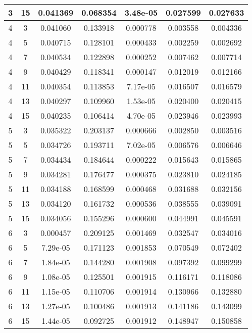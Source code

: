 \begin{longtable}{|c|c|c|c|c|c|c|}
	\hline 3 &	15 &	0.041369 &	0.068354 &	3.48e-05 &	0.027599 &	0.027633 \\
	\hline 4 &	3 &	0.041060 &	0.133918 &	0.000778 &	0.003558 &	0.004336 \\
	\hline \rowcolor{closest} 4 &	5 &	0.040715 &	0.128101 &	0.000433 &	0.002259 &	0.002692 \\
	\hline 4 &	7 &	0.040534 &	0.122898 &	0.000252 &	0.007462 &	0.007714 \\
	\hline 4 &	9 &	0.040429 &	0.118341 &	0.000147 &	0.012019 &	0.012166 \\
	\hline 4 &	11 &	0.040354 &	0.113853 &	7.17e-05 &	0.016507 &	0.016579 \\
	\hline 4 &	13 &	0.040297 &	0.109960 &	1.53e-05 &	0.020400 &	0.020415 \\
	\hline 4 &	15 &	0.040235 &	0.106414 &	4.70e-05 &	0.023946 &	0.023993 \\
	\hline \rowcolor{closest} 5 &	3 &	0.035322 &	0.203137 &	0.000666 &	0.002850 &	0.003516 \\
	\hline 5 &	5 &	0.034726 &	0.193711 &	7.02e-05 &	0.006576 &	0.006646 \\
	\hline 5 &	7 &	0.034434 &	0.184644 &	0.000222 &	0.015643 &	0.015865 \\
	\hline 5 &	9 &	0.034281 &	0.176477 &	0.000375 &	0.023810 &	0.024185 \\
	\hline 5 &	11 &	0.034188 &	0.168599 &	0.000468 &	0.031688 &	0.032156 \\
	\hline 5 &	13 &	0.034120 &	0.161732 &	0.000536 &	0.038555 &	0.039091 \\
	\hline 5 &	15 &	0.034056 &	0.155296 &	0.000600 &	0.044991 &	0.045591 \\
	\hline \rowcolor{closest} 6 &	3 &	0.000457 &	0.209125 &	0.001469 &	0.032547 &	0.034016 \\
	\hline 6 &	5 &	7.29e-05 &	0.171123 &	0.001853 &	0.070549 &	0.072402 \\
	\hline 6 &	7 &	1.84e-05 &	0.144280 &	0.001908 &	0.097392 &	0.099299 \\
	\hline 6 &	9 &	1.08e-05 &	0.125501 &	0.001915 &	0.116171 &	0.118086 \\
	\hline 6 &	11 &	1.15e-05 &	0.110706 &	0.001914 &	0.130966 &	0.132880 \\
	\hline 6 &	13 &	1.27e-05 &	0.100486 &	0.001913 &	0.141186 &	0.143099 \\
	\hline 6 &	15 &	1.44e-05 &	0.092725 &	0.001912 &	0.148947 &	0.150858 \\
	\hline 
\end{longtable} 


